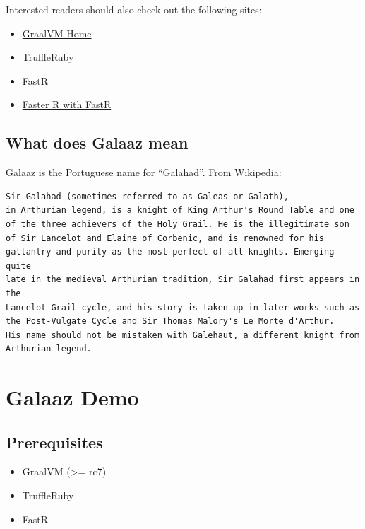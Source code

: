 \documentclass[11pt,]{article}
\providecommand{\tightlist}{%
  \setlength{\itemsep}{0pt}\setlength{\parskip}{0pt}}
\begin{document}
Interested readers should also check out the following sites:

\begin{itemize}
\tightlist
\item
  \href{https://www.graalvm.org/}{GraalVM Home}
\item
  \href{https://github.com/oracle/truffleruby}{TruffleRuby}
\item
  \href{https://github.com/oracle/fastr}{FastR}
\item
  \href{https://medium.com/graalvm/faster-r-with-fastr-4b8db0e0dceb}{Faster
  R with FastR}
\end{itemize}

\subsection{What does Galaaz mean}\label{what-does-galaaz-mean}

Galaaz is the Portuguese name for ``Galahad''. From Wikipedia:

\begin{verbatim}
Sir Galahad (sometimes referred to as Galeas or Galath),
in Arthurian legend, is a knight of King Arthur's Round Table and one
of the three achievers of the Holy Grail. He is the illegitimate son
of Sir Lancelot and Elaine of Corbenic, and is renowned for his
gallantry and purity as the most perfect of all knights. Emerging quite
late in the medieval Arthurian tradition, Sir Galahad first appears in the
Lancelot–Grail cycle, and his story is taken up in later works such as
the Post-Vulgate Cycle and Sir Thomas Malory's Le Morte d'Arthur.
His name should not be mistaken with Galehaut, a different knight from
Arthurian legend. 
\end{verbatim}

\section{Galaaz Demo}\label{galaaz-demo}

\subsection{Prerequisites}\label{prerequisites}

\begin{itemize}
\tightlist
\item
  GraalVM (\textgreater{}= rc7)
\item
  TruffleRuby
\item
  FastR
\end{itemize}
\end{document}
